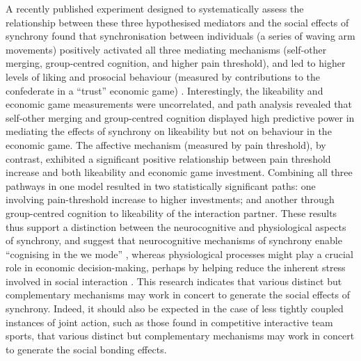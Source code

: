 A recently published experiment designed to systematically assess the relationship between these three hypothesised mediators and the social effects of synchrony found that synchronisation between individuals (a series of waving arm movements) positively activated all three mediating mechanisms (self-other merging, group-centred cognition, and higher pain threshold), and led to higher levels of liking and prosocial behaviour (measured by contributions to the confederate in a ``trust'' economic game) \citep{Lang2017}.  Interestingly, the likeability and economic game measurements were uncorrelated, and path analysis revealed that self-other merging and group-centred cognition displayed high predictive power
in mediating the effects of synchrony on likeability but not on behaviour in the economic game.  The affective mechanism (measured by pain threshold), by contrast, exhibited a significant positive relationship between pain threshold increase and both likeability and economic game investment.  Combining all three pathways in one model resulted in two statistically significant paths: one involving pain-threshold increase to higher investments; and another through group-centred cognition to likeability of the interaction partner.  These results thus support a distinction between the neurocognitive and physiological aspects of synchrony, and suggest that neurocognitive mechanisms of synchrony enable ``cognising in the we mode'' \citep{Gallotti2013,Hasson2016,Kirschner2010}, whereas physiological processes might play a crucial role in economic decision-making, perhaps by helping reduce the inherent stress involved in social interaction \citep{Mogan2017,Kret2015,Stanley2011}. This research indicates that various distinct but complementary mechanisms may work in concert to generate the social effects of synchrony.  Indeed, it should also be expected in the case of less tightly coupled instances of joint action, such as those found in competitive interactive team sports, that various distinct but complementary mechanisms may work in concert to generate the social bonding effects.



